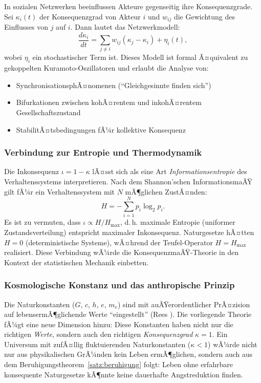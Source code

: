 ﻿\documentclass[a4paper,12pt]{article}
\theoremstyle{definition}
\begin{document}
In sozialen Netzwerken beeinflussen Akteure gegenseitig ihre Konsequenzgrade. Sei $\kappa_i(t)$ der Konsequenzgrad von Akteur $i$ und $w_{ij}$ die Gewichtung des Einflusses von $j$ auf $i$. Dann lautet das Netzwerkmodell:
\[
\frac{d\kappa_i}{dt} = \sum_{j \neq i} w_{ij} (\kappa_j - \kappa_i) + \eta_i(t),
\]
wobei $\eta_i$ ein stochastischer Term ist. Dieses Modell ist formal Ã¤quivalent zu gekoppelten Kuramoto-Oszillatoren \cite{kuramoto1984} und erlaubt die Analyse von:
\begin{itemize}
\item SynchronisationsphÃ¤nomenen (``Gleichgesinnte finden sich'')
\item Bifurkationen zwischen kohÃ¤rentem und inkohÃ¤rentem Gesellschaftszustand
\item StabilitÃ¤tsbedingungen fÃ¼r kollektive Konsequenz
\end{itemize}

\subsubsection{Verbindung zur Entropie und Thermodynamik}

Die Inkonsequenz $\iota = 1 - \kappa$ lÃ¤sst sich als eine Art \emph{Informationsentropie} des Verhaltenssystems interpretieren. Nach dem Shannon'schen InformationsmaÃŸ gilt fÃ¼r ein Verhaltenssystem mit $N$ mÃ¶glichen ZustÃ¤nden:
\[
H = -\sum_{i=1}^{N} p_i \log_2 p_i.
\]
Es ist zu vermuten, dass $\iota \propto H / H_{\max}$, d.\,h. maximale Entropie (uniformer Zustandsverteilung) entspricht maximaler Inkonsequenz. Naturgesetze hÃ¤tten $H = 0$ (deterministische Systeme), wÃ¤hrend der Teufel-Operator $H = H_{\max}$ realisiert. Diese Verbindung wÃ¼rde die KonsequenzmaÃŸ-Theorie in den Kontext der statistischen Mechanik einbetten.

\subsubsection{Kosmologische Konstanz und das anthropische Prinzip}

Die Naturkonstanten ($G$, $c$, $h$, $e$, $m_e$) sind mit auÃŸerordentlicher PrÃ¤zision auf lebensermÃ¶glichende Werte ``eingestellt'' (Rees \cite{rees1999}). Die vorliegende Theorie fÃ¼gt eine neue Dimension hinzu: Diese Konstanten haben nicht nur die richtigen \emph{Werte}, sondern auch den richtigen \emph{Konsequenzgrad} $\kappa = 1$. Ein Universum mit zufÃ¤llig fluktuierenden Naturkonstanten ($\kappa < 1$) wÃ¼rde nicht nur aus physikalischen GrÃ¼nden kein Leben ermÃ¶glichen, sondern auch aus dem Beruhigungstheorem~\ref{satz:beruhigung} folgt: Leben ohne erfahrbare konsequente Naturgesetze kÃ¶nnte keine dauerhafte Angstreduktion finden.
\end{document}
